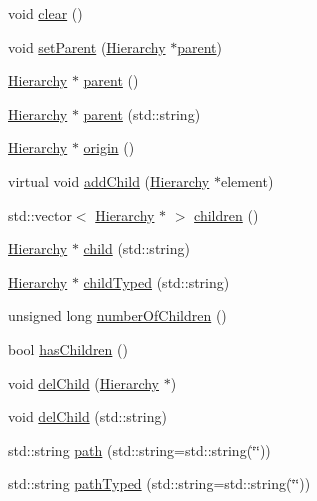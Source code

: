 \begin{DoxyCompactItemize}
\item 
void \hyperlink{classHierarchy_af4d43b0765b402670eed2d62c73405af}{clear} ()
\item 
void \hyperlink{classHierarchy_a585ad1aeec16077a0e532ab8b4fc557b}{set\+Parent} (\hyperlink{classHierarchy}{Hierarchy} $\ast$\hyperlink{classHierarchy_a1c7bec8257e717f9c1465e06ebf845fc}{parent})
\item 
\hyperlink{classHierarchy}{Hierarchy} $\ast$ \hyperlink{classHierarchy_a1c7bec8257e717f9c1465e06ebf845fc}{parent} ()
\item 
\hyperlink{classHierarchy}{Hierarchy} $\ast$ \hyperlink{classHierarchy_ad550588733bf75ac5c0fcfd7c8fd11a6}{parent} (std\+::string)
\item 
\hyperlink{classHierarchy}{Hierarchy} $\ast$ \hyperlink{classHierarchy_aee461dc930ce3871636ff87f075b1b83}{origin} ()
\item 
virtual void \hyperlink{classHierarchy_ad677774ff38fcb257c04a3a10d471fac}{add\+Child} (\hyperlink{classHierarchy}{Hierarchy} $\ast$element)
\item 
std\+::vector$<$ \hyperlink{classHierarchy}{Hierarchy} $\ast$ $>$ \hyperlink{classHierarchy_aa9a76f69e98e052ee1a6e32cea006288}{children} ()
\item 
\hyperlink{classHierarchy}{Hierarchy} $\ast$ \hyperlink{classHierarchy_a1e207f973c694b538bf90107b4868817}{child} (std\+::string)
\item 
\hyperlink{classHierarchy}{Hierarchy} $\ast$ \hyperlink{classHierarchy_a0c15a5276a3b80b4354d6bd8a01e0708}{child\+Typed} (std\+::string)
\item 
unsigned long \hyperlink{classHierarchy_ab16e84de65fd84e14001a6cf941c8be4}{number\+Of\+Children} ()
\item 
bool \hyperlink{classHierarchy_a255174fe4d316d2a3f430dcb9dab29f1}{has\+Children} ()
\item 
void \hyperlink{classHierarchy_a2b2b359fac003233f65786a616766bde}{del\+Child} (\hyperlink{classHierarchy}{Hierarchy} $\ast$)
\item 
void \hyperlink{classHierarchy_a1928ac7615fe0b5e55cd707f70dc6781}{del\+Child} (std\+::string)
\item 
std\+::string \hyperlink{classHierarchy_aa7990fa7caf132d83e361ce033c6c65a}{path} (std\+::string=std\+::string(\char`\"{}\char`\"{}))
\item 
std\+::string \hyperlink{classHierarchy_a1efd56cd164d328d2002e53a10a19b8c}{path\+Typed} (std\+::string=std\+::string(\char`\"{}\char`\"{}))
\item 

\end{DoxyCompactItemize}
